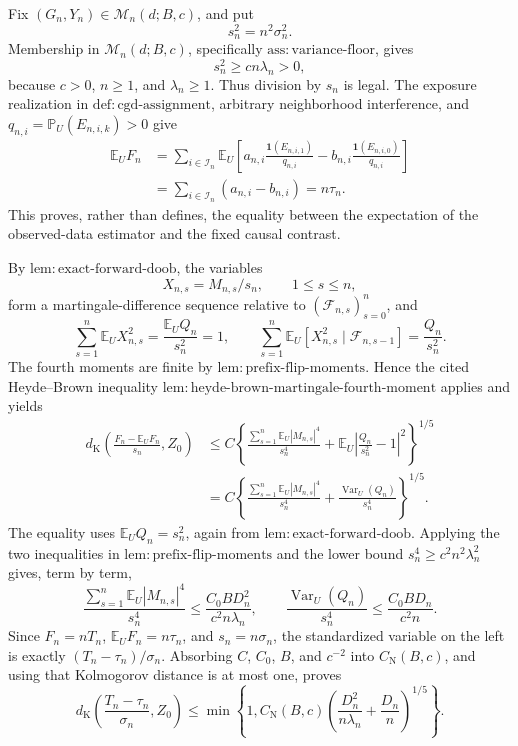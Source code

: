 Fix \((G_n,Y_n)\in\mathcal M_n(d;B,c)\), and put
\[
 s_n^2=n^2\sigma_n^2.
\]
Membership in \(\mathcal M_n(d;B,c)\), specifically \(\mathrm{ass:variance\text{-}floor}\), gives
\[
 s_n^2\ge c n\lambda_n>0,
\]
because \(c>0\), \(n\ge1\), and \(\lambda_n\ge1\).  Thus division by \(s_n\) is legal.  The exposure realization in \(\mathrm{def:cgd\text{-}assignment}\), arbitrary neighborhood interference, and \(q_{n,i}=\mathbb P_U(E_{n,i,k})>0\) give
\[
 \begin{aligned}
 \mathbb E_UF_n
 &=\sum_{i\in\mathcal I_n}\mathbb E_U\left[
 a_{n,i}\frac{\mathbf 1(E_{n,i,1})}{q_{n,i}}
 -b_{n,i}\frac{\mathbf 1(E_{n,i,0})}{q_{n,i}}
 \right]\\
 &=\sum_{i\in\mathcal I_n}(a_{n,i}-b_{n,i})
 =n\tau_n.
 \end{aligned}
\]
This proves, rather than defines, the equality between the expectation of the observed-data estimator and the fixed causal contrast.

By \(\mathrm{lem:exact\text{-}forward\text{-}doob}\), the variables
\[
 X_{n,s}=M_{n,s}/s_n,\qquad 1\le s\le n,
\]
form a martingale-difference sequence relative to \((\mathcal F_{n,s})_{s=0}^n\), and
\[
 \sum_{s=1}^n\mathbb E_UX_{n,s}^2
 =\frac{\mathbb E_UQ_n}{s_n^2}=1,
 \qquad
 \sum_{s=1}^n\mathbb E_U[X_{n,s}^2\mid\mathcal F_{n,s-1}]
 =\frac{Q_n}{s_n^2}.
\]
The fourth moments are finite by \(\mathrm{lem:prefix\text{-}flip\text{-}moments}\).  Hence the cited Heyde--Brown inequality \(\mathrm{lem:heyde\text{-}brown\text{-}martingale\text{-}fourth\text{-}moment}\) applies and yields
\[
 \begin{aligned}
 d_{\mathrm K}\left(\frac{F_n-\mathbb E_UF_n}{s_n},Z_0\right)
 &\le C\left\{
 \frac{\sum_{s=1}^n\mathbb E_U|M_{n,s}|^4}{s_n^4}
 +\mathbb E_U\left|\frac{Q_n}{s_n^2}-1\right|^2
 \right\}^{1/5}\\
 &=C\left\{
 \frac{\sum_{s=1}^n\mathbb E_U|M_{n,s}|^4}{s_n^4}
 +\frac{\operatorname{Var}_U(Q_n)}{s_n^4}
 \right\}^{1/5}.
 \end{aligned}
\]
The equality uses \(\mathbb E_UQ_n=s_n^2\), again from \(\mathrm{lem:exact\text{-}forward\text{-}doob}\).  Applying the two inequalities in \(\mathrm{lem:prefix\text{-}flip\text{-}moments}\) and the lower bound \(s_n^4\ge c^2n^2\lambda_n^2\) gives, term by term,
\[
 \frac{\sum_{s=1}^n\mathbb E_U|M_{n,s}|^4}{s_n^4}
 \le \frac{C_0B D_n^2}{c^2n\lambda_n},
 \qquad
 \frac{\operatorname{Var}_U(Q_n)}{s_n^4}
 \le \frac{C_0B D_n}{c^2n}.
\]
Since \(F_n=nT_n\), \(\mathbb E_UF_n=n\tau_n\), and \(s_n=n\sigma_n\), the standardized variable on the left is exactly \((T_n-\tau_n)/\sigma_n\).  Absorbing \(C\), \(C_0\), \(B\), and \(c^{-2}\) into \(C_{\mathrm N}(B,c)\), and using that Kolmogorov distance is at most one, proves
\[
 d_{\mathrm K}\left(\frac{T_n-\tau_n}{\sigma_n},Z_0\right)
 \le \min\left\{1,C_{\mathrm N}(B,c)
 \left(\frac{D_n^2}{n\lambda_n}+\frac{D_n}{n}\right)^{1/5}\right\}.
\]

